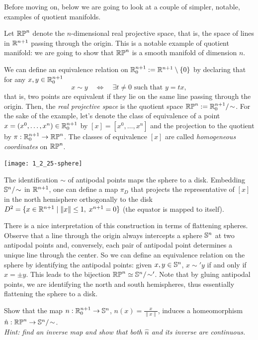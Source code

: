 Before moving on, below we are going to look at a couple of simpler, notable, examples of quotient manifolds.

\begin{example}
  Let $\mathbb{RP}^n$ denote the $n$-dimensional real projective space, that is, the space of lines in $\mathbb{R}^{n+1}$ passing through the origin.
  This is a notable example of quotient manifold: we are going to show that $\mathbb{RP}^n$ is a smooth manifold of dimension $n$. 

  We can define an equivalence relation on $\mathbb{R}^{n+1}_0:=\mathbb{R}^{n+1}\setminus\{0\}$ by declaring that for any $x,y\in \mathbb{R}^{n+1}_0$
  \begin{equation}
    x\sim y \quad\Longleftrightarrow\quad \exists t\neq 0 \mbox{ such that } y=tx,
  \end{equation}
  that is, two points are equivalent if they lie on the same line passing through the origin.
  Then, the \emph{real projective space} is the quotient space $\mathbb{RP}^n := \mathbb{R}^{n+1}_0/\!\sim$.
  For the sake of the example, let's denote the class of equivalence of a point $x=(x^0,\ldots,x^n)\in\mathbb{R}^{n+1}_0$ by $[x]=[x^0,\ldots,x^n]$ and the projection to the quotient by $\pi:\mathbb{R}^{n+1}_0\to\mathbb{RP}^n$.
  The classes of equivalence $[x]$ are called \emph{homogeneous coordinates} on $\mathbb{RP}^n$.
  
  \begin{marginfigure}
    \texttt{[image: 1\_2\_25-sphere]}
    \caption{The identification $\sim$ of antipodal points maps the sphere to a disk. Embedding $\mathbb{S}^n/\!\sim$ in $\mathbb{R}^{n+1}$, one can define a map $\pi_D$ that projects the representative of $[x]$ in the north hemisphere orthogonally to the disk $D^2 = \{x\in\mathbb{R}^{n+1} \mid \|x\|\leq 1, \; x^{n+1}=0\}$ (the equator is mapped to itself). }
  \end{marginfigure}
  There is a nice interpretation of this construction in terms of flattening spheres.
  Observe that a line through the origin always intercepts a sphere $\mathbb{S}^n$ at two antipodal points and, conversely, each pair of antipodal point determines a unique line through the center.
  So we can define an equivalence relation on the sphere by identifying the antipodal points: given $x,y\in\mathbb{S}^n$, $x\sim' y$ if and only if $x = \pm y$.
  This leads to the bijection $\mathbb{RP}^n \simeq \mathbb{S}^n/\!\sim'$.
  Note that by gluing antipodal points, we are identifying the north and south hemispheres, thus essentially flattening the sphere to a disk.

  \begin{exercise}\label{exe:RPSN}
    Show that the map $n: \mathbb{R}^{n+1}_0\to \mathbb{S}^n$, $n(x) = \frac{x}{\|x\|}$, induces a homeomorphism $\hat n:\mathbb{RP}^n \to \mathbb{S}^n/\!\sim$.\\
    \textit{\small Hint: find an inverse map and show that both $\hat n$ and its inverse are continuous.}
  \end{exercise}


\end{example}
